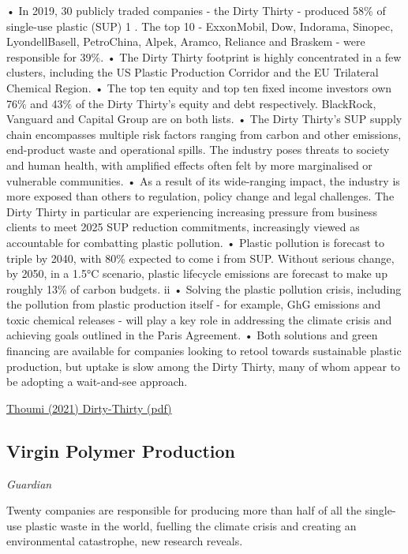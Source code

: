 \documentclass[
]{book}
\begin{document}
• In 2019, 30 publicly traded companies - the Dirty Thirty - produced
58\% of single-use plastic (SUP) 1 . The top 10 - ExxonMobil, Dow, Indorama,
Sinopec, LyondellBasell, PetroChina, Alpek, Aramco, Reliance and Braskem -
were responsible for 39\%.
• The Dirty Thirty footprint is highly concentrated in a few clusters, including
the US Plastic Production Corridor and the EU Trilateral Chemical Region.
• The top ten equity and top ten fixed income investors own 76\% and 43\%
of the Dirty Thirty's equity and debt respectively. BlackRock, Vanguard
and Capital Group are on both lists.
• The Dirty Thirty's SUP supply chain encompasses multiple risk factors ranging
from carbon and other emissions, end-product waste and operational spills.
The industry poses threats to society and human health, with amplified
effects often felt by more marginalised or vulnerable communities.
• As a result of its wide-ranging impact, the industry is more exposed
than others to regulation, policy change and legal challenges. The Dirty
Thirty in particular are experiencing increasing pressure from business
clients to meet 2025 SUP reduction commitments, increasingly viewed as
accountable for combatting plastic pollution.
• Plastic pollution is forecast to triple by 2040, with 80\% expected to come
i
from SUP. Without serious change, by 2050, in a 1.5°C scenario, plastic
lifecycle emissions are forecast to make up roughly 13\% of carbon budgets. ii
• Solving the plastic pollution crisis, including the pollution from plastic
production itself - for example, GhG emissions and toxic chemical releases
- will play a key role in addressing the climate crisis and achieving goals
outlined in the Paris Agreement.
• Both solutions and green financing are available for companies looking to
retool towards sustainable plastic production, but uptake is slow among the
Dirty Thirty, many of whom appear to be adopting a wait-and-see approach.

\href{pdf/Dirty-Thirty.pdf}{Thoumi (2021) Dirty-Thirty (pdf)}

\hypertarget{virgin-polymer-production}{%
\subsection{Virgin Polymer Production}\label{virgin-polymer-production}}

\emph{Guardian}

Twenty companies are responsible for producing more than half of all the single-use plastic waste in the world, fuelling the climate crisis and creating an environmental catastrophe, new research reveals.
\end{document}
